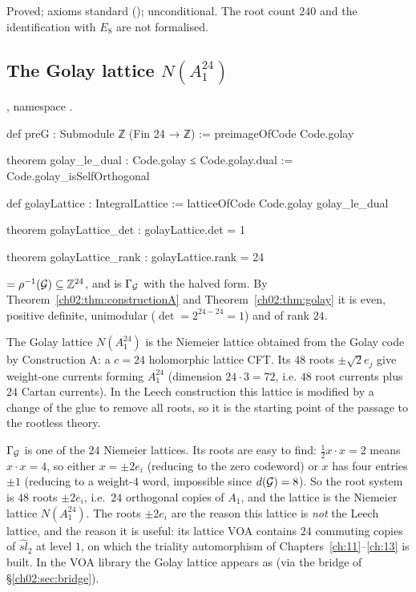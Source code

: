 \begin{status}
Proved; axioms standard (); unconditional.  The root count $240$ and the
identification with $E_8$ are not formalised.
\end{status}

\subsection{\texorpdfstring{The Golay lattice $N(A_1^{24})$}{The Golay lattice N(A1^24)}}\label{ch02:sec:golaylattice}

\begin{definition}
, namespace .
\end{definition}
\begin{leancode}
def preG : Submodule ℤ (Fin 24 → ℤ) := preimageOfCode Code.golay

theorem golay_le_dual : Code.golay ≤ Code.golay.dual := Code.golay_isSelfOrthogonal

def golayLattice : IntegralLattice := latticeOfCode Code.golay golay_le_dual

theorem golayLattice_det : golayLattice.det = 1

theorem golayLattice_rank : golayLattice.rank = 24
\end{leancode}
\begin{dictionary}
 $=\rho^{-1}(\mathcal{G})\subseteq{\mathbb{Z}}^{24}$, and  is
$\Gamma_{\mathcal{G}}$ with the halved form.  By Theorem~\ref{ch02:thm:constructionA} and
Theorem~\ref{ch02:thm:golay} it is even, positive definite, unimodular ($\det=2^{24-24}=1$) and of
rank $24$.
\end{dictionary}
\begin{physics}
The Golay lattice $N(A_1^{24})$ is the Niemeier lattice obtained from the Golay code by Construction A: a $c=24$ holomorphic lattice CFT. Its $48$ roots $\pm\sqrt2 e_j$ give weight-one currents forming $A_1^{24}$ (dimension $24\cdot3=72$, i.e. $48$ root currents plus $24$ Cartan currents). In the Leech construction this lattice is modified by a change of the glue to remove all roots, so it is the starting point of the passage to the rootless theory.
\end{physics}

$\Gamma_{\mathcal{G}}$ is one of the $24$ Niemeier lattices.  Its roots are easy to find: $\tfrac12
x\cdot x=2$ means $x\cdot x=4$, so either $x=\pm2e_i$ (reducing to the zero codeword) or $x$ has
four entries $\pm1$ (reducing to a weight-$4$ word, impossible since $d(\mathcal{G})=8$).  So the root
system is $48$ roots $\pm2e_i$, i.e.\ $24$ orthogonal copies of $A_1$, and the lattice is the
Niemeier lattice $N(A_1^{24})$.  The roots $\pm2e_i$ are the reason this lattice is
\emph{not} the Leech lattice, and the reason it is useful: its lattice VOA contains $24$ commuting
copies of $\widehat{sl}_2$ at level $1$, on which the triality automorphism of
Chapters~\ref{ch:11}--\ref{ch:13} is built.  In the VOA library the Golay lattice appears as
 (via the bridge of \S\ref{ch02:sec:bridge}).

